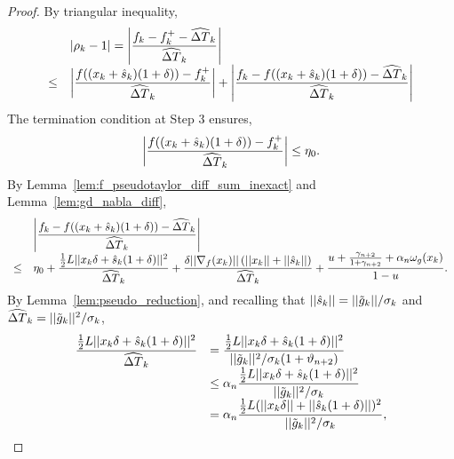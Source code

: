\documentclass{article}[12pt]
\begin{document}
    \begin{proof}
    	By triangular inequality,
    	\begin{equation}
    		\label{eq:sigma-very-successful-inexact-sum_proof_1}
    		\begin{array}{ll}
    			& |\rho_k - 1|  =\left| \dfrac{f_k - f_k^+ - \widehat{\Delta T}_k}{ \widehat{\Delta T}_k}\right|\\
    			\leq & \left|\dfrac{f((x_k+\hat{s}_{k})(1+\delta)) - f_k^+}{\widehat{\Delta T}_k}\right| + \left|\dfrac{f_k - f((x_k+\hat{s}_{k})(1+\delta)) - \widehat{\Delta T}_k}{\widehat{\Delta T}_k}\right|\\
    		\end{array}
    	\end{equation} 
    	The termination condition at Step 3 ensures,
    	\begin{equation}
    		\label{eq:sigma-very-successful-inexact-sum_proof_2}
    		\left|\dfrac{f((x_k+\hat{s}_{k})(1+\delta)) - f_k^+}{\widehat{\Delta T}_k}\right| \leq \eta_0.
    	\end{equation}
    	By Lemma~\ref{lem:f_pseudotaylor_diff_sum_inexact} and Lemma~\ref{lem:gd_nabla_diff},
    	\begin{equation}
    		\label{eq:sigma-very-successful-inexact-sum_proof_3}
    		\begin{array}{ll}
    			& \left|\dfrac{f_k - f((x_k+\hat{s}_{k})(1+\delta)) - \widehat{\Delta T}_k}{\widehat{\Delta T}_k}\right|\\
    			\leq & \eta_0 + \dfrac{\tfrac{1}{2}L||x_k \delta+\hat{s}_{k}(1+\delta)||^2}{\widehat{\Delta T}_k} + \dfrac{\delta||\nabla_f(x_k)||\left(||x_k||+||\hat{s}_{k}||\right)}{\widehat{\Delta T}_k}+  \dfrac{u+\frac{\gamma_{n+2}}{1+\gamma_{n+2}}+\alpha_n\omega_g(x_k)}{1-u}.
    		\end{array}
    	\end{equation}
    	By Lemma~\ref{lem:pseudo_reduction}, and recalling that $||\hat{s}_{k}|| = ||\tilde{g}_k||/\sigma_k$ and $\widehat{\Delta T}_k = ||\tilde{g}_k||^2/\sigma_k$,
    	\begin{equation}
    		\begin{array}{ll}
    			\dfrac{\tfrac{1}{2}L||x_k \delta+\skfp{k}(1+\delta)||^2}{\tsdifffp_k} & = \dfrac{\tfrac{1}{2}L||x_k \delta+\skfp{k}(1+\delta)||^2}{||\gd_k||^2/\sigma_k(1+\vartheta_{n+2})} \\
    			& \leq \alpha_n \dfrac{\tfrac{1}{2}L||x_k \delta+\skfp{k}(1+\delta)||^2}{||\gd_k||^2/\sigma_k}\\
    			& = \alpha_n \dfrac{\tfrac{1}{2}L(||x_k \delta|| + ||\skfp{k}(1+\delta)||)^2}{||\gd_k||^2/\sigma_k},
    		\end{array}

\end{equation}
\end{proof}
\end{document}

